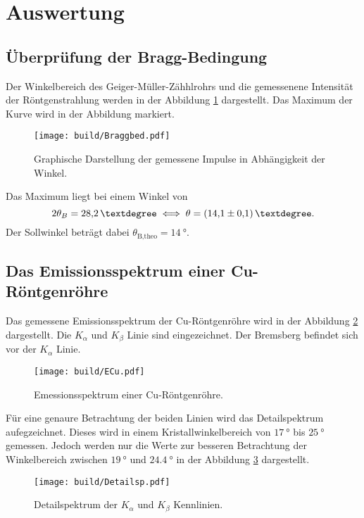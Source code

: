 \section{Auswertung}
\label{sec:Auswertung}

\subsection{Überprüfung der Bragg-Bedingung}
Der Winkelbereich des Geiger-Müller-Zähhlrohrs und die gemessenene Intensität der Röntgenstrahlung werden in der Abbildung \ref{fig:Braggb}
dargestellt.
Das Maximum der Kurve wird in der Abbildung markiert. 
\begin{figure}[H]
    \centering
    \texttt{[image: build/Braggbed.pdf]}
    \caption{Graphische Darstellung der gemessene Impulse in Abhängigkeit der Winkel.}
    \label{fig:Braggb}
\end{figure}
\noindent Das Maximum liegt bei einem Winkel von
\begin{equation*}
    2 \theta_B = \qty{28.2}{°} \iff \theta = \qty{14.1 \pm 0.1}{°}.
\end{equation*}
Der Sollwinkel beträgt dabei $\theta_\text{B,theo} = \qty{14}{°}$.


\subsection{Das Emissionsspektrum einer Cu-Röntgenröhre}
Das gemessene Emissionsspektrum der Cu-Röntgenröhre wird in der Abbildung \ref{fig:ECu} dargestellt.
Die $K_\alpha$ und $K_\beta$ Linie sind eingezeichnet.
Der Bremsberg befindet sich vor der $K_\alpha$ Linie.
\begin{figure}[H]
    \centering
    \texttt{[image: build/ECu.pdf]}
    \caption{Emessionsspektrum einer Cu-Röntgenröhre.}
    \label{fig:ECu}
\end{figure}

\noindent Für eine genaure Betrachtung der beiden Linien wird das Detailspektrum aufegzeichnet.
Dieses wird in einem Kristallwinkelbereich von $\qty{17}{°}$ bis $\qty{25}{°}$ gemessen.
Jedoch werden nur die Werte zur besseren Betrachtung der Winkelbereich zwischen $\qty{19}{°}$ und $\qty{24.4}{°}$ in der Abbildung \ref{fig:Detail} dargestellt.

\begin{figure}[H]
    \centering
    \texttt{[image: build/Detailsp.pdf]}
    \caption{Detailspektrum der $K_\alpha$ und $K_\beta$ Kennlinien.}
    \label{fig:Detail}
\end{figure}

